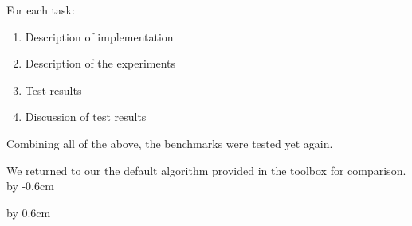\noindent
For each task:
\begin{enumerate}
\item	 Description of implementation
\item	 Description of the experiments
\item Test results
\item Discussion of test results
\end{enumerate}


Combining all of the above, the benchmarks were tested yet again.\\

\par\noindent We returned to our the default algorithm provided in the toolbox for comparison. \\

\advance\voffset by -0.6cm

\advance\voffset by 0.6cm




